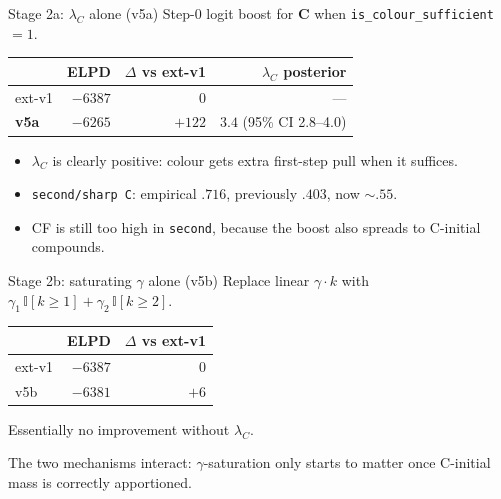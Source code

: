 \documentclass[10pt,aspectratio=169]{beamer}
\newcommand{\main}[1]{\textcolor{CSP-main-dark}{\textbf{#1}}}
\newcommand{\emp}[1]{\textcolor{CSP-emphasis}{\textbf{#1}}}
\newcommand{\accg}[1]{\textcolor{CSP-accent-3-dark}{#1}}      %
\begin{document}
\begin{frame}{Stage 2a: $\lambda_C$ alone (v5a)}
Step-0 logit boost for \emp{C} when \texttt{is\_colour\_sufficient} $= 1$.

\vspace{0.5em}
\begin{center}
\begin{tabular}{lrrr}
\toprule
& ELPD & $\Delta$ vs ext-v1 & $\lambda_C$ posterior\\
\midrule
ext-v1 & $-6387$ & 0 & --- \\
\main{v5a}    & \main{$-6265$} & \main{$+122$}  & \main{$3.4$} (95\% CI 2.8--4.0) \\
\bottomrule
\end{tabular}
\end{center}

\vspace{0.5em}
\begin{itemize}\itemsep0.2em
  \item $\lambda_C$ is clearly positive: colour gets extra first-step pull when it suffices.
  \item \accg{\texttt{second/sharp C}}: empirical $.716$, previously $.403$, now $\sim .55$.
  \item CF is still too high in \texttt{second}, because the boost also spreads to C-initial compounds.
\end{itemize}
\end{frame}

\begin{frame}{Stage 2b: saturating $\gamma$ alone (v5b)}
Replace linear $\gamma \cdot k$ with $\gamma_1 \,\mathbb{I}[k \geq 1] + \gamma_2\,\mathbb{I}[k \geq 2]$.

\vspace{0.5em}
\begin{center}
\begin{tabular}{lrr}
\toprule
& ELPD & $\Delta$ vs ext-v1\\
\midrule
ext-v1 & $-6387$ & 0 \\
v5b    & $-6381$ & \emp{$+6$} \\
\bottomrule
\end{tabular}
\end{center}

\vspace{0.5em}
Essentially no improvement without $\lambda_C$.

\vspace{0.5em}
The two mechanisms interact: $\gamma$-saturation only starts to matter once C-initial mass is correctly apportioned.
\end{frame}
\end{document}
